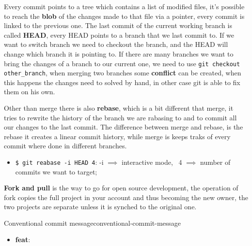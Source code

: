 \documentclass[12pt]{article}
\begin{document}
Every commit points to a tree which contains a list of modified files, it's possible to reach the \textbf{blob} of the changes made to that file via a pointer, every commit is linked to the previous one. The last commit of the current working branch is called \textbf{HEAD}, every HEAD points to a branch that we last commit to. If we want to switch branch we need to checkout the branch, and the HEAD will change which branch it is pointing to. If there are many branches we want to bring the changes of a branch to our current one, we need to use \texttt{git checkout other_branch}, when merging two branches some \textbf{conflict} can be created, when this happens the changes need to solved by hand, in other case git is able to fix them on his own.

Other than merge there is also \textbf{rebase}, which is a bit different that merge, it tries to rewrite the history of the branch we are rabasing to and to commit all our changes to the last commit. The difference between merge and rebase, is the rebase it creates a linear commit history, while merge is keeps traks of every commit where done in different branches.
\begin{itemize}
    \item \texttt{\$ git reabase -i HEAD~4}: -i $ \implies$ interactive mode, ~4 $ \implies$ number of commits we want to target;
\end{itemize}
\begin{example}{}{}
    
\end{example}
\textbf{Fork and pull} is the way to go for open source development, the operation of fork copies the full project in your account and thus becoming the new owner, the two projects are separate unless it is synched to the original one.

\begin{definition}{Conventional commit message}{conventional-commit-message}
    \begin{itemize}
        \item \textbf{feat}:
    \end{itemize}
\end{definition}
\end{document}
